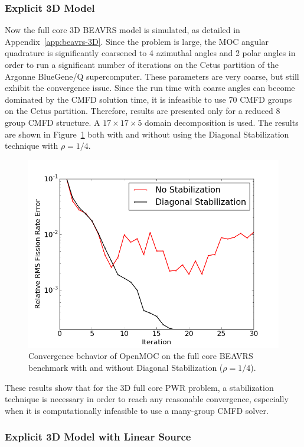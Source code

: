 \subsubsection{Explicit 3D Model}

Now the full core 3D BEAVRS model is simulated, as detailed in Appendix~\ref{app:beavrs-3D}. Since the problem is large, the \ac{MOC} angular quadrature is significantly coarsened to 4 azimuthal angles and 2 polar angles in order to run a significant number of iterations on the Cetus partition of the Argonne BlueGene/Q supercomputer. These parameters are very coarse, but still exhibit the convergence issue. Since the run time with coarse angles can become dominated by the \ac{CMFD} solution time, it is infeasible to use 70 \ac{CMFD} groups on the Cetus partition. Therefore, results are presented only for a reduced 8 group \ac{CMFD} structure. A $17 \times 17 \times 5$ domain decomposition is used. The results are shown in Figure~\ref{fig:fc-3D} both with and without using the Diagonal Stabilization technique with $\rho = 1/4$. 

\begin{figure}[ht!]
	\centering
	\includegraphics[width=0.65\linewidth]{figures/convergence/full-core-3D.png}
	\caption{Convergence behavior of OpenMOC on the full core \ac{BEAVRS} benchmark with and without Diagonal Stabilization ($\rho = 1/4$).}
	\label{fig:fc-3D}
\end{figure}

These results show that for the 3D full core \ac{PWR} problem, a stabilization technique is necessary in order to reach any reasonable convergence, especially when it is computationally infeasible to use a many-group \ac{CMFD} solver.

\subsubsection{Explicit 3D Model with Linear Source}

